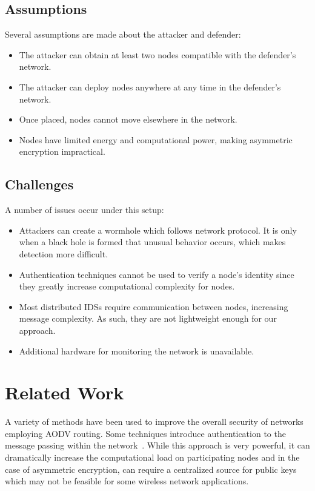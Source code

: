 \documentclass[12pt,a4paper]{report}
\begin{document}
\subsection{Assumptions}
Several assumptions are made about the attacker and defender:
\begin{itemize}
    \item The attacker can obtain at least two nodes compatible with the defender's network.
    \item The attacker can deploy nodes anywhere at any time in the defender's network.
    \item Once placed, nodes cannot move elsewhere in the network.
    \item Nodes have limited energy and computational power, making asymmetric encryption impractical.
\end{itemize}

\subsection{Challenges}
A number of issues occur under this setup:
\begin{itemize}
    \item Attackers can create a wormhole which follows network protocol. It is only when a black hole is formed that unusual behavior occurs, which makes detection more difficult.
    \item Authentication techniques cannot be used to verify a node's identity since they greatly increase computational complexity for nodes.
    \item Most distributed IDSs require communication between nodes, increasing message complexity. As such, they are not lightweight enough for our approach.
    \item Additional hardware for monitoring the network is unavailable.
\end{itemize}

\pagebreak
\section{Related Work}
A variety of methods have been used to improve the overall security of networks employing AODV routing. Some techniques introduce authentication to the message passing within the network~\cite{Hu:2005:ASO:1160100.1160103, 1181388, 806983}. While this approach is very powerful, it can dramatically increase the computational load on participating nodes and in the case of asymmetric encryption, can require a centralized source for public keys which may not be feasible for some wireless network applications.
\end{document}
